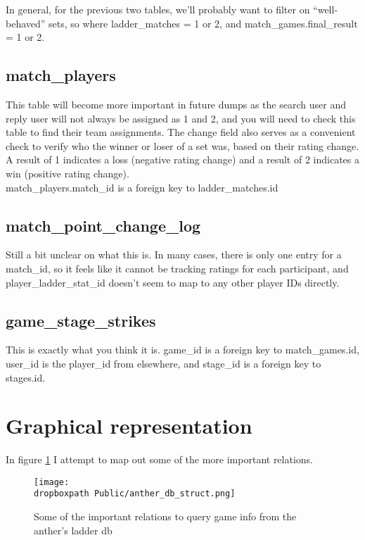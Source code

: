 \documentclass[12pt]{article}
\def \dropboxpath {/Users/rmuraglia/Dropbox/} %
\begin{document}
In general, for the previous two tables, we'll probably want to filter on ``well-behaved'' sets, so where ladder\_matches = 1 or 2, and match\_games.final\_result = 1 or 2.

\subsection{match\_players} %
\label{sub:match_players}

This table will become more important in future dumps as the search user and reply user will not always be assigned as 1 and 2, and you will need to check this table to find their team assignments.
The change field also serves as a convenient check to verify who the winner or loser of a set was, based on their rating change.
A result of 1 indicates a loss (negative rating change) and a result of 2 indicates a win (positive rating change). \\
match\_players.match\_id is a foreign key to ladder\_matches.id


\subsection{match\_point\_change\_log} %
\label{sub:match_point_change_log}
Still a bit unclear on what this is. In many cases, there is only one entry for a match\_id, so it feels like it cannot be tracking ratings for each participant, and player\_ladder\_stat\_id doesn't seem to map to any other player IDs directly.

\subsection{game\_stage\_strikes} %
\label{sub:game_stage_strikes}
This is exactly what you think it is. game\_id is a foreign key to match\_games.id, user\_id is the player\_id from elsewhere, and stage\_id is a foreign key to stages.id.


\section{Graphical representation} %
\label{sec:graphical_representation}
In figure \ref{fig:anther_db_struct} I attempt to map out some of the more important relations.
\begin{figure}[]
  \centering
  \texttt{[image: \\dropboxpath Public/anther\_db\_struct.png]}
  \caption{Some of the important relations to query game info from the anther's ladder db}
  \label{fig:anther_db_struct}
\end{figure}
\end{document}
